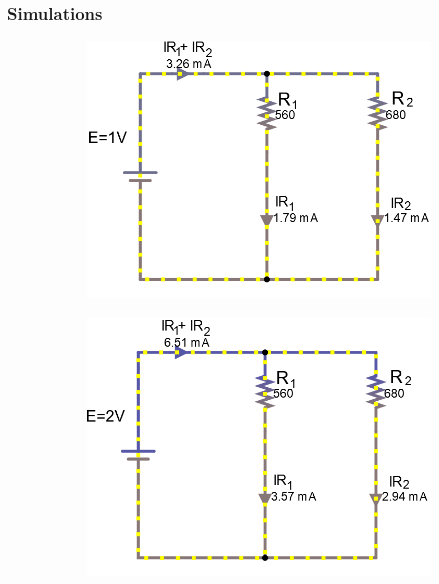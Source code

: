 \documentclass[a4paper]{article}
\begin{document}
\subsubsection{Simulations}
\begin{figure}[H]
\begin{subfigure}{0.48\textwidth}
\includegraphics[width=1.16\linewidth]{amps_1}
\end{subfigure}
\begin{subfigure}{0.48\textwidth}
\includegraphics[width=1.16\linewidth]{amps_2}
\end{subfigure}
\begin{subfigure}{0.48\textwidth}

\end{subfigure}
\end{figure}
\end{document}
